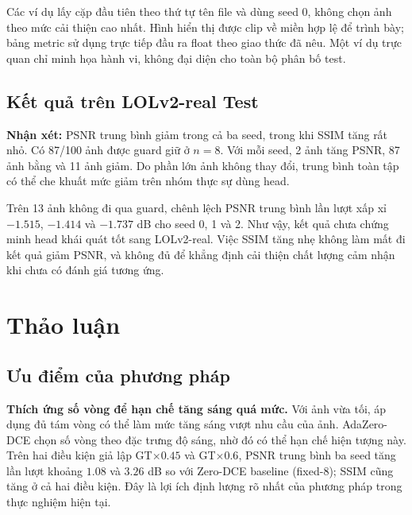 Các ví dụ lấy cặp đầu tiên theo thứ tự tên file và dùng seed 0, không chọn ảnh theo mức cải thiện cao nhất. Hình hiển thị được clip về miền hợp lệ để trình bày; bảng metric sử dụng trực tiếp đầu ra float theo giao thức đã nêu. Một ví dụ trực quan chỉ minh họa hành vi, không đại diện cho toàn bộ phân bố test.

\subsection{Kết quả trên LOLv2-real Test}

\textbf{Nhận xét:} PSNR trung bình giảm trong cả ba seed, trong khi SSIM tăng rất nhỏ. Có 87/100 ảnh được guard giữ ở $n=8$. Với mỗi seed, 2 ảnh tăng PSNR, 87 ảnh bằng và 11 ảnh giảm. Do phần lớn ảnh không thay đổi, trung bình toàn tập có thể che khuất mức giảm trên nhóm thực sự dùng head.

Trên 13 ảnh không đi qua guard, chênh lệch PSNR trung bình lần lượt xấp xỉ $-1.515$, $-1.414$ và $-1.737$ dB cho seed 0, 1 và 2. Như vậy, kết quả chưa chứng minh head khái quát tốt sang LOLv2-real. Việc SSIM tăng nhẹ không làm mất đi kết quả giảm PSNR, và không đủ để khẳng định cải thiện chất lượng cảm nhận khi chưa có đánh giá tương ứng.

\section{Thảo luận}
\subsection{Ưu điểm của phương pháp}
\textbf{Thích ứng số vòng để hạn chế tăng sáng quá mức.} Với ảnh vừa tối, áp dụng đủ tám vòng có thể làm mức tăng sáng vượt nhu cầu của ảnh. AdaZero-DCE chọn số vòng theo đặc trưng độ sáng, nhờ đó có thể hạn chế hiện tượng này. Trên hai điều kiện giả lập GT$\times0.45$ và GT$\times0.6$, PSNR trung bình ba seed tăng lần lượt khoảng $1.08$ và $3.26$ dB so với Zero-DCE baseline (fixed-8); SSIM cũng tăng ở cả hai điều kiện. Đây là lợi ích định lượng rõ nhất của phương pháp trong thực nghiệm hiện tại.

